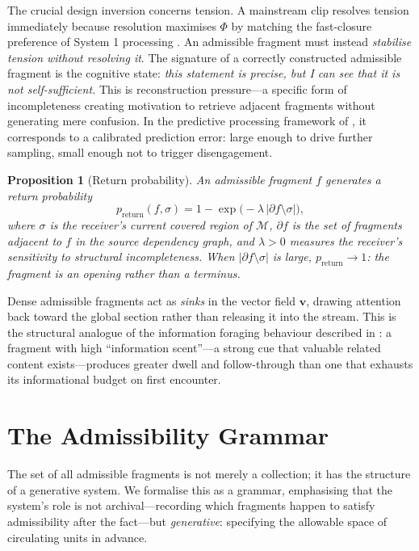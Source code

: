\documentclass{amsart}
\theoremstyle{plain}
\newtheorem{proposition}[theorem]{Proposition}
\theoremstyle{definition}
\theoremstyle{remark}
\newcommand{\scalar}{\Phi}
\newcommand{\vfield}{\mathbf{v}}
\newcommand{\Man}{\mathcal{M}}
\begin{document}
The crucial design inversion concerns tension.  A mainstream clip resolves tension
immediately because resolution maximises $\scalar$ by matching the fast-closure
preference of System 1 processing \cite{kahneman2011}.  An admissible fragment
must instead \emph{stabilise tension without resolving it}.  The signature of a
correctly constructed admissible fragment is the cognitive state: \textit{this
statement is precise, but I can see that it is not self-sufficient.}  This is
reconstruction pressure---a specific form of incompleteness creating motivation to
retrieve adjacent fragments without generating mere confusion.  In the predictive
processing framework of \cite{clark2013,friston2010}, it corresponds to a
calibrated prediction error: large enough to drive further sampling, small enough
not to trigger disengagement.

\begin{proposition}[Return probability]
  \label{prop:return}
  An admissible fragment $f$ generates a return probability
  \[
    p_{\mathrm{return}}(f, \sigma)
    = 1 - \exp\!\bigl(-\lambda\,|\partial f \setminus \sigma|\bigr),
  \]
  where $\sigma$ is the receiver's current covered region of $\Man$, $\partial f$
  is the set of fragments adjacent to $f$ in the source dependency graph, and
  $\lambda > 0$ measures the receiver's sensitivity to structural incompleteness.
  When $|\partial f \setminus \sigma|$ is large, $p_{\mathrm{return}} \to 1$: the
  fragment is an opening rather than a terminus.
\end{proposition}

Dense admissible fragments act as \emph{sinks} in the vector field $\vfield$,
drawing attention back toward the global section rather than releasing it into the
stream.  This is the structural analogue of the information foraging behaviour
described in \cite{pirolli1999}: a fragment with high ``information scent''---a
strong cue that valuable related content exists---produces greater dwell and
follow-through than one that exhausts its informational budget on first encounter.

\section{The Admissibility Grammar}
\label{sec:grammar}

The set of all admissible fragments is not merely a collection; it has the
structure of a generative system.  We formalise this as a grammar, emphasising
that the system's role is not archival---recording which fragments happen to satisfy
admissibility after the fact---but \emph{generative}: specifying the allowable
space of circulating units in advance.
\end{document}
